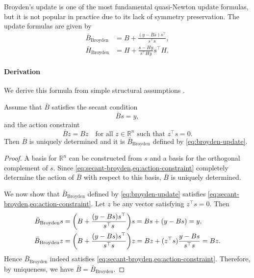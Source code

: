 \documentclass[0_en]{subfiles}
\begin{document}
Broyden's update is one of the most fundamental quasi-Newton update formulas, but it is not popular in practice due to its lack of symmetry preservation.
The update formulas are given by
\begin{align}
    \bar{B}_{\mathrm{Broyden}} & = B + \frac{(y - Bs)s^\top}{s^\top s}, \label{eq:broyden-update}           \\
    \bar{H}_{\mathrm{Broyden}} & = H + \frac{s - Hy}{s^\top Hy} s^\top H. \label{eq:broyden-inverse-update}
\end{align}

\paragraph{Derivation}

We derive this formula from simple structural assumptions \citep[Section 4]{dennisjr.QuasiNewtonMethodsMotivation1977a}.
\begin{proposition}
    Assume that $\bar{B}$ satisfies the secant condition
    \begin{equation}\label{eq:secant-broyden}
        \bar{B}s = y,
    \end{equation}
    and the action constraint
    \begin{equation}\label{eq:action-constraint}
        \bar{B}z = Bz
        \quad\text{for all } z\in\mathbb{R}^n \text{ such that } z^\top s = 0.
    \end{equation}
    Then $\bar{B}$ is uniquely determined and it is $\bar{B}_{\mathrm{Broyden}}$ defined by \cref{eq:broyden-update}.
\end{proposition}
\begin{proof}
    A basis for $\mathbb{R}^n$ can be constructed from $s$ and a basis for the orthogonal complement of $s$. Since \cref{eq:secant-broyden,eq:action-constraint} completely determine the action of $\bar{B}$ with respect to this basis, $\bar{B}$ is uniquely determined.

    We now show that $\bar{B}_{\mathrm{Broyden}}$ defined by \cref{eq:broyden-update} satisfies \cref{eq:secant-broyden,eq:action-constraint}. Let $z$ be any vector satisfying $z^\top s = 0$. Then
    \begin{align*}
        \bar{B}_{\mathrm{Broyden}} s
         & = \qty(B + \frac{(y - Bs)s^\top}{s^\top s}) s
        = Bs + (y - Bs)
        = y,                                             \\
        \bar{B}_{\mathrm{Broyden}} z
         & = \qty(B + \frac{(y - Bs)s^\top}{s^\top s}) z
        = Bz + (z^\top s) \frac{y - Bs}{s^\top s}
        = Bz.
    \end{align*}
    Hence $\bar{B}_{\mathrm{Broyden}}$ indeed satisfies \cref{eq:secant-broyden,eq:action-constraint}. Therefore, by uniqueness, we have $\bar{B} = \bar{B}_{\mathrm{Broyden}}$.
\end{proof}
\end{document}
